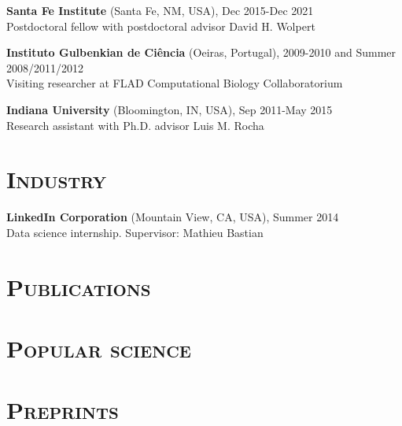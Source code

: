 \documentclass[margin,line,centered]{res}
\begin{document}
\begin{resume}
\textbf{Santa Fe Institute} (Santa Fe, NM, USA), Dec 2015-Dec 2021 \\
Postdoctoral fellow with postdoctoral advisor David H. Wolpert

\textbf{Instituto Gulbenkian de Ciência} (Oeiras, Portugal), 2009-2010 and Summer 2008/2011/2012 \\
Visiting researcher at FLAD Computational Biology Collaboratorium

\textbf{Indiana University} (Bloomington, IN, USA), Sep 2011-May 2015\\
Research assistant with Ph.D. advisor Luis M. Rocha 

\section{\textsc{Industry}}

\textbf{LinkedIn Corporation} (Mountain View, CA, USA), Summer 2014\\
Data science internship. Supervisor: Mathieu Bastian

\section{\textsc{Publications}}



\section{\textsc{Popular science}}



\section{\textsc{Preprints}}



\end{resume}
\end{document}
